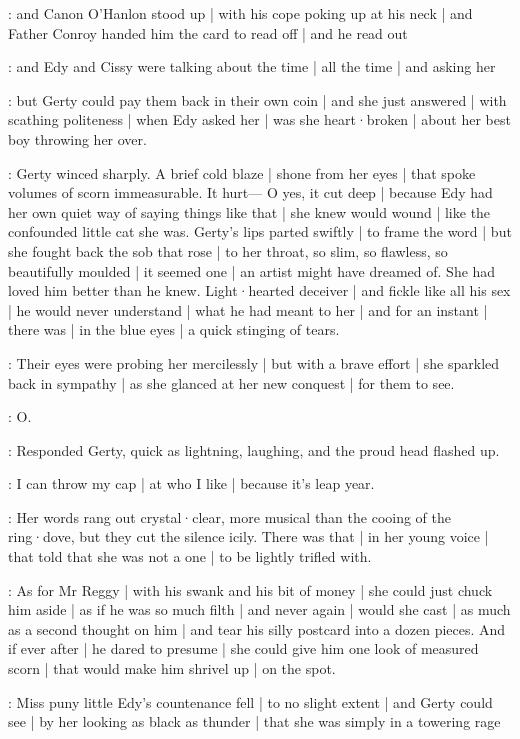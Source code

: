 \Nrelig:
and Canon O'Hanlon stood up |
with his cope poking up at his neck |
and Father Conroy handed him the card to read off |
and he read out 

:
and Edy and Cissy were talking
about the time |
all the time |
and asking her

\gertyJudgy:
but Gerty could pay them back in their own coin |
and she just answered |
with scathing politeness |
when Edy asked her |
was she heart·broken |
about her best boy throwing her over.

\gertyNovel:
Gerty winced sharply.
A brief cold blaze |
shone from her eyes |
that spoke volumes of scorn immeasurable.
It hurt—%
O yes,
it cut deep |
because Edy had her own quiet way
of saying things like that |%
she knew would wound |
like the confounded little cat
she was.
Gerty's lips parted swiftly |
to frame the word |
but she fought back the sob that rose |
to her throat,
so slim,
so flawless,
so beautifully moulded |
it seemed one |
an artist might have dreamed of.
She had loved him better than he knew.
Light·hearted deceiver |
and fickle like all his sex |
he would never understand |
what he had meant to her |
and for an instant |
there was |
in the blue eyes |
a quick stinging of tears.

\gertyRomantic:
Their eyes were probing her mercilessly |
but with a brave effort |
she sparkled back in sympathy |
as she glanced at her new conquest |
for them to see.

\gerty:
O.

:
Responded Gerty,
quick as lightning,
laughing,
and the proud head flashed up.

\gerty:
I can throw my cap |
at who I like |%
because it's leap year.

\gertyNovel:
Her words rang out crystal·clear,
more musical
than the cooing of the ring·dove,
but they cut the silence icily.
There was that |
in her young voice |
that told
that she was not a one |
to be lightly trifled with.

\gertyJudgy:
As for Mr Reggy |
with his swank and his bit of money |
she could just chuck him aside |
as if he was so much filth |
and never again |
would she cast |
as much as a second thought on him |
and tear his silly postcard into a dozen pieces.
And if ever after |
he dared to presume |
she could give him one look of measured scorn |
that would make him shrivel up |
on the spot.

\Nnovel:
Miss puny little Edy's countenance fell |
to no slight extent |
and Gerty could see |
by her looking as black as thunder |%
that she was simply in a towering rage

